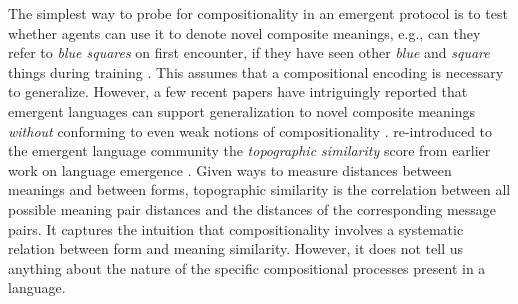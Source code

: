 The simplest way to probe for compositionality in an emergent protocol
is to test whether agents can use it to denote novel composite
meanings, e.g., can they refer to \emph{blue squares} on first encounter, if
they have seen other \emph{blue} and \emph{square} things during
training \cite{Choi:etal:2018}. This assumes that a
compositional encoding is necessary to generalize. However, a few recent papers have intriguingly reported %
that emergent languages can support generalization to novel composite meanings \emph{without} conforming to even weak notions of
compositionality \cite{Lazaridou:etal:2018,Andreas:2019,Chaabouni:etal:2020}. %
 re-introduced to the emergent language
community the \emph{topographic similarity} score from earlier work on
language emergence \cite{Brighton:2006}. Given ways to measure
distances between meanings and between forms, topographic similarity
is the correlation between all possible meaning pair distances and the
distances of the corresponding message pairs. It captures the intuition that compositionality involves a systematic
relation between form and meaning similarity. However, it does not tell us
anything about the nature of the specific compositional processes present
in a language. %
